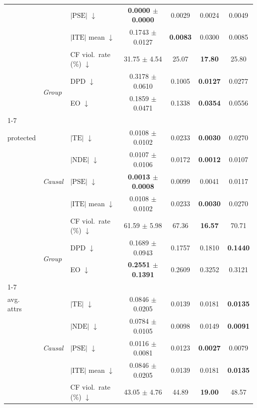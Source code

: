 \begin{table}[t]
\begin{tabular}{@{}lll cccc@{}}
  & & $|\mathrm{PSE}|$ $\downarrow$ & \textbf{0.0000 $\pm$ 0.0000} & 0.0029 & 0.0024 & 0.0049 \\
  & & $|\mathrm{ITE}|$ mean $\downarrow$ & 0.1743 $\pm$ 0.0127 & \textbf{0.0083} & 0.0300 & 0.0085 \\
  & & CF viol.\ rate (\%) $\downarrow$ & 31.75 $\pm$ 4.54 & 25.07 & \textbf{17.80} & 25.80 \\
  & \multirow{2}{*}{\scriptsize\textit{Group}} & DPD $\downarrow$ & 0.3178 $\pm$ 0.0610 & 0.1005 & \textbf{0.0127} & 0.0277 \\
  & & EO $\downarrow$ & 0.1859 $\pm$ 0.0471 & 0.1338 & \textbf{0.0354} & 0.0556 \\
\cmidrule(lr){1-7}
  \multirow{7}{*}{\makecell[l]{\textit{Citizenship}\\[-2pt]\scriptsize protected}} & \multirow{5}{*}{\scriptsize\textit{Causal}} & $|\mathrm{TE}|$ $\downarrow$ & 0.0108 $\pm$ 0.0102 & 0.0233 & \textbf{0.0030} & 0.0270 \\
  & & $|\mathrm{NDE}|$ $\downarrow$ & 0.0107 $\pm$ 0.0106 & 0.0172 & \textbf{0.0012} & 0.0107 \\
  & & $|\mathrm{PSE}|$ $\downarrow$ & \textbf{0.0013 $\pm$ 0.0008} & 0.0099 & 0.0041 & 0.0117 \\
  & & $|\mathrm{ITE}|$ mean $\downarrow$ & 0.0108 $\pm$ 0.0102 & 0.0233 & \textbf{0.0030} & 0.0270 \\
  & & CF viol.\ rate (\%) $\downarrow$ & 61.59 $\pm$ 5.98 & 67.36 & \textbf{16.57} & 70.71 \\
  & \multirow{2}{*}{\scriptsize\textit{Group}} & DPD $\downarrow$ & 0.1689 $\pm$ 0.0943 & 0.1757 & 0.1810 & \textbf{0.1440} \\
  & & EO $\downarrow$ & \textbf{0.2551 $\pm$ 0.1391} & 0.2609 & 0.3252 & 0.3121 \\
\cmidrule(lr){1-7}
  \multirow{7}{*}{\makecell[l]{\textit{Overall}\\[-2pt]\scriptsize avg. attrs}} & \multirow{5}{*}{\scriptsize\textit{Causal}} & $|\mathrm{TE}|$ $\downarrow$ & 0.0846 $\pm$ 0.0205 & 0.0139 & 0.0181 & \textbf{0.0135} \\
  & & $|\mathrm{NDE}|$ $\downarrow$ & 0.0784 $\pm$ 0.0105 & 0.0098 & 0.0149 & \textbf{0.0091} \\
  & & $|\mathrm{PSE}|$ $\downarrow$ & 0.0116 $\pm$ 0.0081 & 0.0123 & \textbf{0.0027} & 0.0079 \\
  & & $|\mathrm{ITE}|$ mean $\downarrow$ & 0.0846 $\pm$ 0.0205 & 0.0139 & 0.0181 & \textbf{0.0135} \\
  & & CF viol.\ rate (\%) $\downarrow$ & 43.05 $\pm$ 4.76 & 44.89 & \textbf{19.00} & 48.57 \\

\end{tabular}
\end{table}
